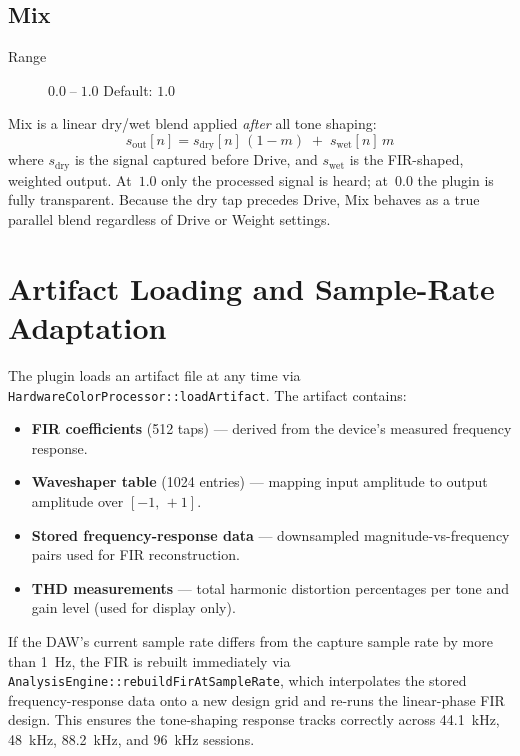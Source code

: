 \documentclass[11pt, letterpaper]{article}
\begin{document}
\subsection{Mix}

\begin{description}
  \item[Range] \(0.0 \;\text{--}\; 1.0\) \quad Default: \(1.0\)
\end{description}

Mix is a linear dry/wet blend applied \emph{after} all tone shaping:
\[
  s_{\text{out}}[n] = s_{\text{dry}}[n]\,(1 - m) \;+\; s_{\text{wet}}[n]\, m
\]
where \(s_{\text{dry}}\) is the signal captured before Drive, and
\(s_{\text{wet}}\) is the FIR-shaped, weighted output.  At~\(1.0\)
only the processed signal is heard; at~\(0.0\) the plugin is fully
transparent.  Because the dry tap precedes Drive, Mix behaves as a
true parallel blend regardless of Drive or Weight settings.

\section{Artifact Loading and Sample-Rate Adaptation}

The plugin loads an artifact file at any time via
\texttt{HardwareColorProcessor::loadArtifact}.  The artifact contains:
\begin{itemize}
  \item \textbf{FIR coefficients} (512 taps) — derived from the
        device's measured frequency response.
  \item \textbf{Waveshaper table} (1024 entries) — mapping input
        amplitude to output amplitude over \([-1,\,+1]\).
  \item \textbf{Stored frequency-response data} — downsampled
        magnitude-vs-frequency pairs used for FIR reconstruction.
  \item \textbf{THD measurements} — total harmonic distortion
        percentages per tone and gain level (used for display only).
\end{itemize}

If the DAW's current sample rate differs from the capture sample rate
by more than 1~Hz, the FIR is rebuilt immediately via
\texttt{AnalysisEngine::rebuildFirAtSampleRate}, which interpolates the
stored frequency-response data onto a new design grid and re-runs the
linear-phase FIR design.  This ensures the tone-shaping response tracks
correctly across 44.1~kHz, 48~kHz, 88.2~kHz, and 96~kHz sessions.
\end{document}
